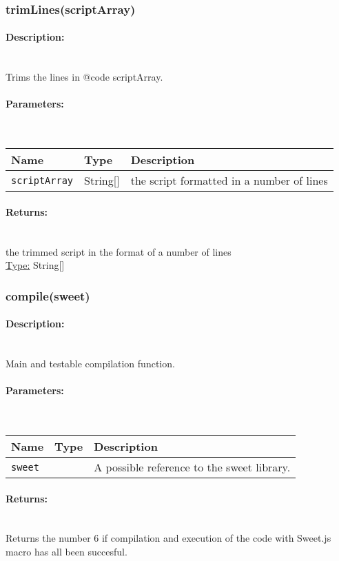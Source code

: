 \subsubsection{trimLines(scriptArray)} 
\paragraph{Description:} \hfill \\ 
Trims the lines in {@code scriptArray}.
\paragraph{Parameters:} \hfill \\ 
\begin{tabular}{|l|l|l|}
\hline
\textbf{Name} & \textbf{Type} & \textbf{Description} \\ 
\hline
\texttt{scriptArray} & String[] & the script formatted in a number of lines\\ 
\hline
\end{tabular}
\paragraph{Returns:} \hfill \\ 
the trimmed script in the format of a number of lines\\ 
\underline{Type:} String[]
\subsubsection{compile(sweet)} 
\paragraph{Description:} \hfill \\ 
Main and testable compilation function.
\paragraph{Parameters:} \hfill \\ 
\begin{tabular}{|l|l|l|}
\hline
\textbf{Name} & \textbf{Type} & \textbf{Description} \\ 
\hline
\texttt{sweet} &  & A possible reference to the sweet library.\\ 
\hline
\end{tabular}
\paragraph{Returns:} \hfill \\ 
Returns the number 6 if compilation and execution of the code with Sweet.js macro has all been succesful.\\ 
